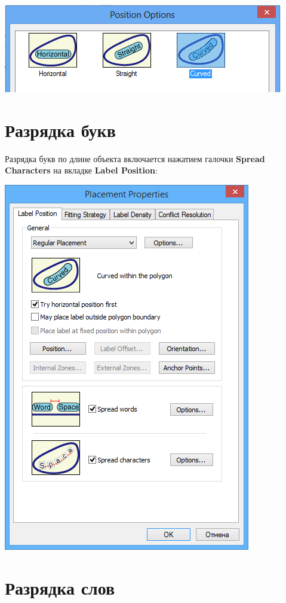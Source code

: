 \documentclass[12pt,]{book}
\begin{document}
\includegraphics{images/Appendix/image45.png}

\hypertarget{section-29}{%
\section{Разрядка букв}\label{section-29}}

Разрядка букв по длине объекта включается нажатием галочки \textbf{Spread Characters} на вкладке \textbf{Label Position}:

\includegraphics{images/Appendix/image46.png}

\hypertarget{section-30}{%
\section{Разрядка слов}\label{section-30}}
\end{document}
